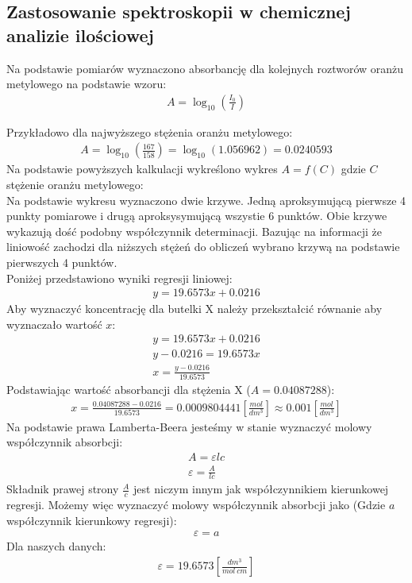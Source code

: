 \documentclass[11pt]{article}
\begin{document}
    \subsection{Zastosowanie spektroskopii w chemicznej analizie ilościowej}
    \par Na podstawie pomiarów wyznaczono absorbancję dla kolejnych roztworów oranżu metylowego na podstawie wzoru:
    \begin{gather}
        A=\log_{10}(\frac{I_0}{I})
    \end{gather}
    \par Przykładowo dla najwyższego stężenia oranżu metylowego:
    \begin{gather}
        A=\log_{10}(\frac{167}{158})=\log_{10}(1.056962)=0.0240593
    \end{gather}
    \noident Na podstawie powyższych kalkulacji wykreślono wykres $A=f(C)$ gdzie $C$ stężenie oranżu metylowego:\\
    \noindent{}
    \indent Na podstawie wykresu wyznaczono dwie krzywe. Jedną aproksymującą pierwsze 4 punkty pomiarowe i drugą aproksysymującą wszystie 6
    punktów. Obie krzywe wykazują dość podobny współczynnik determinacji. Bazując na informacji że liniowość zachodzi dla niższych stężeń
    do obliczeń wybrano krzywą na podstawie pierwszych 4 punktów.\\
    \indent Poniżej przedstawiono wyniki regresji liniowej:
    \begin{gather}
        y=19.6573x+0.0216
    \end{gather}
    \noindent Aby wyznaczyć koncentrację dla butelki X należy przekształcić równanie aby wyznaczało wartość $x$:
    \begin{gather}
        y=19.6573x+0.0216 \\
        y-0.0216=19.6573x \\
        x=\frac{y-0.0216}{19.6573}
    \end{gather}
    \noindent Podstawiając wartość absorbancji dla stężenia X ($A=0.04087288$):
    \begin{gather}
        x=\frac{0.04087288-0.0216}{19.6573}=0.0009804441\left[\frac{mol}{dm^3}\right]\approx 0.001\left[\frac{mol}{dm^3}\right]
    \end{gather}
    \noindent Na podstawie prawa Lamberta-Beera jesteśmy w stanie wyznaczyć molowy współczynnik absorbcji:
    \begin{gather}
        A=\varepsilon lc\\
        \varepsilon=\frac{A}{lc}
    \end{gather}
    \noindent Składnik prawej strony $\frac{A}{c}$ jest niczym innym jak współczynnikiem kierunkowej regresji. Możemy więc
    wyznaczyć molowy współczynnik absorbcji jako (Gdzie $a$ współczynnik kierunkowy regresji):
    \begin{gather}
        \varepsilon=a
    \end{gather}
    \noindent Dla naszych danych:
    \begin{gather}
        \varepsilon=19.6573\left[\frac{dm^3}{mol\ cm}\right]
    \end{gather}
\end{document}

